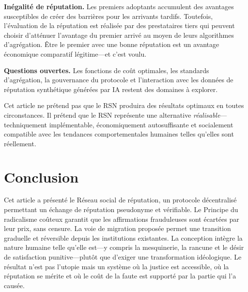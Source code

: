 \documentclass[11pt,a4paper,twocolumn]{article}
\begin{document}
\textbf{Inégalité de réputation.} Les premiers adoptants accumulent des avantages susceptibles de créer des barrières pour les arrivants tardifs. Toutefois, l'évaluation de la réputation est réalisée par des prestataires tiers qui peuvent choisir d'atténuer l'avantage du premier arrivé au moyen de leurs algorithmes d'agrégation. Être le premier avec une bonne réputation est un avantage économique comparatif légitime---et c'est voulu.

\textbf{Questions ouvertes.} Les fonctions de coût optimales, les standards d'agrégation, la gouvernance du protocole et l'interaction avec les données de réputation synthétique générées par IA restent des domaines à explorer.

Cet article ne prétend pas que le RSN produira des résultats optimaux en toutes circonstances. Il prétend que le RSN représente une alternative \emph{réalisable}---techniquement implémentable, économiquement autosuffisante et socialement compatible avec les tendances comportementales humaines telles qu'elles sont réellement.

\section{Conclusion}

Cet article a présenté le Réseau social de réputation, un protocole décentralisé permettant un échange de réputation pseudonyme et vérifiable. Le Principe du radicalisme coûteux garantit que les affirmations frauduleuses sont écartées par leur prix, sans censure. La voie de migration proposée permet une transition graduelle et réversible depuis les institutions existantes. La conception intègre la nature humaine telle qu'elle est---y compris la mesquinerie, la rancune et le désir de satisfaction punitive---plutôt que d'exiger une transformation idéologique. Le résultat n'est pas l'utopie mais un système où la justice est accessible, où la réputation se mérite et où le coût de la faute est supporté par la partie qui l'a causée.


\end{document}
